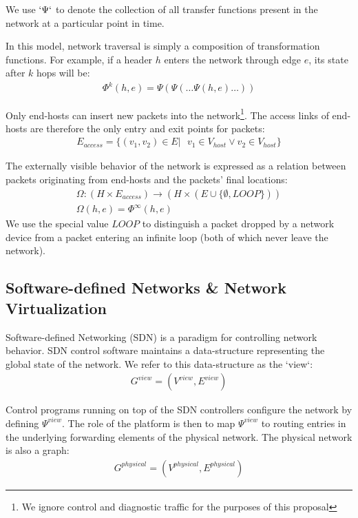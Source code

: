 \documentclass{sig-alternate-10pt}
\begin{document}
We use $`\Psi`$ to denote the collection of all transfer functions present in
the network at a particular point in time.

In this model, network traversal is simply a composition of transformation
functions. For example, if a header $h$ enters the network through edge
$e$, its state after $k$ hops will be:
\begin{align*}
\Phi^k(h,e) = \Psi(\Psi(\dots \Psi(h,e)\dots))
\end{align*}

Only end-hosts can insert new packets into the network\footnote{We ignore
control and diagnostic traffic for the purposes of this proposal}. The access links
of end-hosts are therefore the only entry and exit points for packets:
\begin{align*}
E_{access} = \{ (v_1,v_2) \in E |\text{ } v_1 \in V_{host} \vee v_2 \in V_{host} \}
\end{align*}

The externally visible behavior of the network is expressed as a relation between
packets originating from end-hosts and the packets' final locations:
\begin{align*}
\Omega: (H \times E_{access}) \rightarrow (H \times (E \cup
\{\emptyset, LOOP\})) \\
\Omega(h,e) = \Phi^{\infty}(h,e)
\end{align*}
We use the special value $LOOP$ to distinguish
a packet dropped by a network device from a packet entering an
infinite loop (both of which never leave the network).

\subsection{Software-defined Networks \& Network Virtualization}

Software-defined Networking (SDN) is a paradigm for controlling network behavior.
SDN control software maintains a data-structure representing the global state of the
network. We refer to this data-structure as the `view`:
\begin{align*}
G^{view} = (V^{view},E^{view})
\end{align*}

Control programs running on top of the SDN controllers configure the network by
defining $\Psi^{view}$. The role of the platform is then to map $\Psi^{view}$ to
routing entries in the underlying forwarding elements of the
physical network. The physical network is also a graph:
\begin{align*}
G^{physical} = (V^{physical}, E^{physical}) 
\end{align*}
\end{document}
